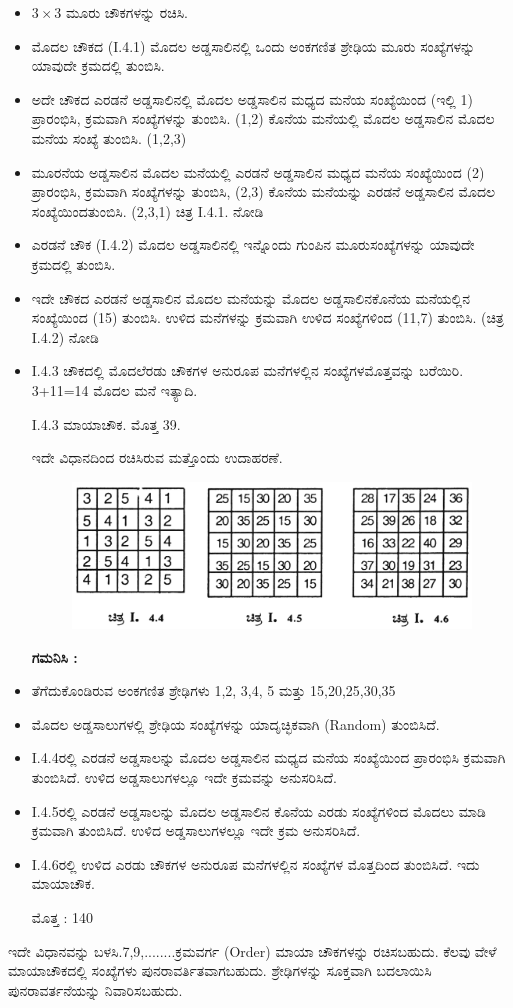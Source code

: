 \begin{itemize}
	\item $3 \times 3$ ಮೂರು ಚೌಕಗಳನ್ನು ರಚಿಸಿ.
	\item ಮೊದಲ ಚೌಕದ (I.4.1) ಮೊದಲ ಅಡ್ಡಸಾಲಿನಲ್ಲಿ ಒಂದು ಅಂಕಗಣಿತ ಶ್ರೇಢಿಯ ಮೂರು ಸಂಖ್ಯೆಗಳನ್ನು ಯಾವುದೇ ಕ್ರಮದಲ್ಲಿ ತುಂಬಿಸಿ.
	\item ಅದೇ ಚೌಕದ ಎರಡನೆ ಅಡ್ಡಸಾಲಿನಲ್ಲಿ ಮೊದಲ ಅಡ್ಡಸಾಲಿನ ಮಧ್ಯದ ಮನೆಯ ಸಂಖ್ಯೆ\-ಯಿಂದ (ಇಲ್ಲಿ 1) ಪ್ರಾರಂಭಿಸಿ, ಕ್ರಮವಾಗಿ ಸಂಖ್ಯೆಗಳನ್ನು ತುಂಬಿಸಿ. (1,2) ಕೊನೆಯ ಮನೆಯಲ್ಲಿ ಮೊದಲ ಅಡ್ಡಸಾಲಿನ ಮೊದಲ ಮನೆಯ ಸಂಖ್ಯೆ ತುಂಬಿಸಿ. (1,2,3)
	\item ಮೂರನೆಯ ಅಡ್ಡಸಾಲಿನ ಮೊದಲ ಮನೆಯಲ್ಲಿ ಎರಡನೆ ಅಡ್ಡಸಾಲಿನ ಮಧ್ಯದ ಮನೆಯ ಸಂಖ್ಯೆಯಿಂದ (2) ಪ್ರಾರಂಭಿಸಿ, ಕ್ರಮವಾಗಿ ಸಂಖ್ಯೆಗಳನ್ನು ತುಂಬಿಸಿ, (2,3) ಕೊನೆಯ ಮನೆಯನ್ನು ಎರಡನೆ ಅಡ್ಡಸಾಲಿನ ಮೊದಲ ಸಂಖ್ಯೆಯಿಂದ\break ತುಂಬಿಸಿ. (2,3,1) ಚಿತ್ರ I.4.1. ನೋಡಿ
	\item ಎರಡನೆ ಚೌಕ (I.4.2) ಮೊದಲ ಅಡ್ಡಸಾಲಿನಲ್ಲಿ ಇನ್ನೊಂದು ಗುಂಪಿನ ಮೂರು\break ಸಂಖ್ಯೆಗಳನ್ನು ಯಾವುದೇ ಕ್ರಮದಲ್ಲಿ ತುಂಬಿಸಿ.
	\item ಇದೇ ಚೌಕದ ಎರಡನೆ ಅಡ್ಡಸಾಲಿನ ಮೊದಲ ಮನೆಯನ್ನು ಮೊದಲ ಅಡ್ಡಸಾಲಿನ\break ಕೊನೆಯ ಮನೆಯಲ್ಲಿನ ಸಂಖ್ಯೆಯಿಂದ (15) ತುಂಬಿಸಿ. ಉಳಿದ ಮನೆಗಳನ್ನು ಕ್ರಮ\-ವಾಗಿ ಉಳಿದ ಸಂಖ್ಯೆಗಳಿಂದ (11,7) ತುಂಬಿಸಿ. (ಚಿತ್ರ I.4.2) ನೋಡಿ
	\item I.4.3 ಚೌಕದಲ್ಲಿ ಮೊದಲೆರಡು ಚೌಕಗಳ ಅನುರೂಪ ಮನೆಗಳಲ್ಲಿನ ಸಂಖ್ಯೆಗಳ\break ಮೊತ್ತವನ್ನು ಬರೆಯಿರಿ. 3+11=14 ಮೊದಲ ಮನೆ ಇತ್ಯಾದಿ.

	I.4.3 ಮಾಯಾಚೌಕ. ಮೊತ್ತ 39.

	ಇದೇ ವಿಧಾನದಿಂದ ರಚಿಸಿರುವ ಮತ್ತೊಂದು ಉದಾಹರಣೆ.
	\begin{figure}[h]
	\includegraphics[scale=.95]{src/figures/chap3/fig3.10.jpg}
	\end{figure}

	\textbf{ಗಮನಿಸಿ :}
	\smallskip

	\item ತೆಗೆದುಕೊಂಡಿರುವ ಅಂಕಗಣಿತ ಶ್ರೇಢಿಗಳು 1,2, 3,4, 5 ಮತ್ತು 15,20,25,30,35
	\item ಮೊದಲ ಅಡ್ಡಸಾಲುಗಳಲ್ಲಿ ಶ್ರೇಢಿಯ ಸಂಖ್ಯೆಗಳನ್ನು ಯಾದೃಚ್ಛಿಕವಾಗಿ (Random) ತುಂಬಿಸಿದೆ.
	\item I.4.4ರಲ್ಲಿ ಎರಡನೆ ಅಡ್ಡಸಾಲನ್ನು ಮೊದಲ ಅಡ್ಡಸಾಲಿನ ಮಧ್ಯದ ಮನೆಯ ಸಂಖ್ಯೆಯಿಂದ ಪ್ರಾರಂಭಿಸಿ ಕ್ರಮವಾಗಿ ತುಂಬಿಸಿದೆ. ಉಳಿದ ಅಡ್ಡಸಾಲುಗಳಲ್ಲೂ ಇದೇ ಕ್ರಮ\-ವನ್ನು ಅನುಸರಿಸಿದೆ.
	\item I.4.5ರಲ್ಲಿ ಎರಡನೆ ಅಡ್ಡಸಾಲನ್ನು ಮೊದಲ ಅಡ್ಡಸಾಲಿನ ಕೊನೆಯ ಎರಡು ಸಂಖ್ಯೆ\-ಗಳಿಂದ ಮೊದಲು ಮಾಡಿ ಕ್ರಮವಾಗಿ ತುಂಬಿಸಿದೆ. ಉಳಿದ ಅಡ್ಡಸಾಲುಗಳಲ್ಲೂ ಇದೇ ಕ್ರಮ ಅನುಸರಿಸಿದೆ.
	\item I.4.6ರಲ್ಲಿ ಉಳಿದ ಎರಡು ಚೌಕಗಳ ಅನುರೂಪ ಮನೆಗಳಲ್ಲಿನ ಸಂಖ್ಯೆಗಳ ಮೊತ್ತದಿಂದ ತುಂಬಿಸಿದೆ. ಇದು ಮಾಯಾಚೌಕ.

	ಮೊತ್ತ : 140
\end{itemize}
ಇದೇ ವಿಧಾನವನ್ನು ಬಳಸಿ.7,9,........ಕ್ರಮವರ್ಗ (Order) ಮಾಯಾ ಚೌಕಗಳನ್ನು ರಚಿಸ\-ಬಹುದು. ಕೆಲವು ವೇಳೆ ಮಾಯಾಚೌಕದಲ್ಲಿ ಸಂಖ್ಯೆಗಳು ಪುನರಾವರ್ತಿತವಾಗಬಹುದು. ಶ್ರೇಢಿ\-ಗಳನ್ನು ಸೂಕ್ತವಾಗಿ ಬದಲಾಯಿಸಿ ಪುನರಾವರ್ತನೆಯನ್ನು ನಿವಾರಿಸಬಹುದು.


